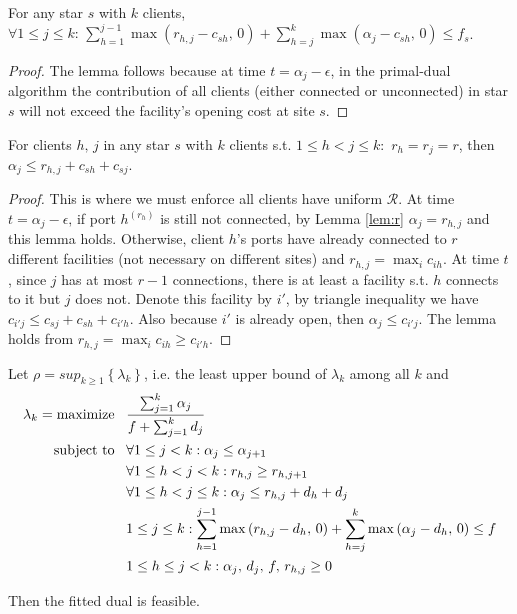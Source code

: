 \documentclass[10pt]{llncs}
\begin{document}
\begin{lemma}
For any star $s$ with $k$ clients, $\forall1\leq j\leq k:\,\sum_{h=1}^{j-1}\max\left(r_{h,j}-c_{sh},\,0\right)+\sum_{h=j}^{k}\max$$\left(\alpha_{j}-c_{sh},\,0\right)$$\leq f_{s}$.\label{lem:contri}\end{lemma}
\begin{proof}
The lemma follows because at time $t=\alpha_{j}-\epsilon$, in the
primal-dual algorithm the contribution of all clients (either connected
or unconnected) in star $s$ will not exceed the facility's opening
cost at site $s$.\end{proof}
\begin{lemma}
For clients $h,\, j$ in any star $s$ with $k$ clients s.t. $1\leq h<j\leq k:$
$r_{h}=r_{j}=r$, then ${\displaystyle \alpha_{j}\leq r_{h,j}+c_{sh}+c_{sj}}$.\label{lem:tri}\end{lemma}
\begin{proof}
This is where we must enforce all clients have uniform $\mathcal{R}$.
At time $t=\alpha_{j}-\epsilon,\,$if port $h^{\left(r_{h}\right)}$
is still not connected, by Lemma \ref{lem:r} $\alpha_{j}=r_{h,j}$
and this lemma holds. Otherwise, client $h$'s ports have already
connected to $r$ different facilities (not necessary on different
sites) and $r_{h,j}=\max_{i}c_{ih}$. At time $t$, since $j$ has
at most $r-1$ connections, there is at least a facility s.t. $h$
connects to it but $j$ does not. Denote this facility by $i'$, by
triangle inequality we have $c_{i'j}\leq c_{sj}+c_{sh}+c_{i'h}$.
Also because $i'$ is already open, then $\alpha_{j}\leq c_{i'j}$.
The lemma holds from $r_{h,j}=\max_{i}c_{ih}\geq c_{i'h}$.\end{proof}
\begin{theorem}
Let $\rho=sup_{k\geq1}\left\{ \lambda_{k}\right\} $, i.e. the least
upper bound of $\lambda_{k}$ among all $k$ and\label{thm:FRL}{\small \begin{align}
\lambda_{k}=\textrm{maximize\,\,\,\,\,} & {\displaystyle \frac{\sum_{j=1}^{k}\alpha_{j}}{f+\sum_{j=1}^{k}d_{j}}}\nonumber \\
\textrm{subject to\,\,\,\,\,} & \forall1\leq j<k:\alpha_{j}\leq\alpha_{j+1}\nonumber \\
 & \forall1\leq h<j<k:r_{h,j}\geq r_{h,j+1}\nonumber \\
 & \forall1\leq h<j\leq k:{\displaystyle \alpha_{j}\leq r_{h,j}+d_{h}+d_{j}}\label{eq:FRP}\\
 & 1\leq j\leq k:\sum_{h=1}^{j-1}\max\left(r_{h,j}-d_{h},\,0\right)+\sum_{h=j}^{k}\max\left(\alpha_{j}-d_{h},\,0\right)\leq f\nonumber \\
 & 1\leq h\leq j<k:\alpha_{j},\, d_{j},\, f,\, r_{h,j}\geq0\nonumber \end{align}
}{\small \par}

Then the fitted dual is feasible.\end{theorem}
\end{document}
